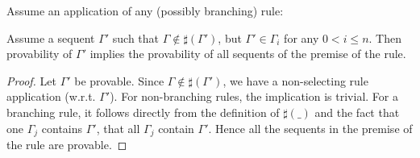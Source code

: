\documentclass{llncs}
\begin{document}
\begin{lemma}
Assume an application of any (possibly branching) rule:
\begin{quote}
\centerline{}
\end{quote}
Assume a sequent $\Gamma'$ such that $\Gamma\notin\sharp(\Gamma')$,
but $\Gamma'\in \Gamma_i$ for any $0<i\leq n$.
Then provability of $\Gamma'$ implies the provability of all sequents of
the premise of the rule.
\begin{proof} Let $\Gamma'$ be provable. Since $\Gamma\notin\sharp(\Gamma')$, we have a non-selecting
rule application (w.r.t. $\Gamma'$). For non-branching rules, the implication is trivial. For a
branching rule, it follows directly from the definition of $\sharp(\_)$ and the fact that one
$\Gamma_j$ contains $\Gamma'$, that all $\Gamma_j$ contain $\Gamma'$.
Hence all the sequents in the premise of the rule are provable.
\end{proof}
\label{lemma:provabilityPropagates}
\end{lemma}





\end{document}
